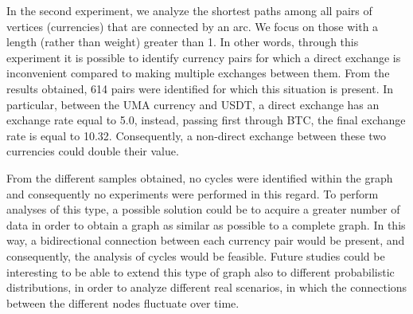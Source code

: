 In the second experiment, we analyze the shortest paths among all pairs of vertices (currencies) that are connected by an arc.
We focus on those with a length (rather than weight) greater than 1.
In other words, through this experiment it is possible to identify currency pairs for which a direct exchange is inconvenient compared to making multiple exchanges between them.
From the results obtained, 614 pairs were identified for which this situation is present. In particular, between the UMA currency and USDT, a direct exchange has an exchange rate equal to 5.0, instead, passing first through BTC, the final exchange rate is equal to 10.32. Consequently, a non-direct exchange between these two currencies could double their value.

From the different samples obtained, no cycles were identified within the graph and consequently no experiments were performed in this regard. To perform analyses of this type, a possible solution could be to acquire a greater number of data in order to obtain a graph as similar as possible to a complete graph. In this way, a bidirectional connection between each currency pair would be present, and consequently, the analysis of cycles would be feasible.
Future studies could be interesting to be able to extend this type of graph also to different probabilistic distributions, in order to analyze different real scenarios, in which the connections between the different nodes fluctuate over time.
